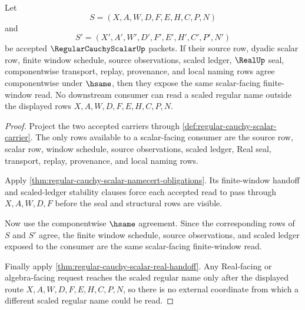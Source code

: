 \begin{theorem}
\label{thm:regular-cauchy-scalar-window-stability}
Let
$$
S=(X,A,W,D,F,E,H,C,P,N)
$$
and
$$
S'=(X',A',W',D',F',E',H',C',P',N')
$$
be accepted $\RegularCauchyScalarUp$ packets. If their source row, dyadic scalar row, finite window schedule, source observations, scaled ledger, $\RealUp$ seal, componentwise transport, replay, provenance, and local naming rows agree componentwise under $\hsame$, then they expose the same scalar-facing finite-window read. No downstream consumer can read a scaled regular name outside the displayed rows $X,A,W,D,F,E,H,C,P,N$.
\end{theorem}
\begin{proof}
Project the two accepted carriers through \autoref{def:regular-cauchy-scalar-carrier}. The only rows available to a scalar-facing consumer are the source row, scalar row, window schedule, source observations, scaled ledger, Real seal, transport, replay, provenance, and local naming rows.

Apply \autoref{thm:regular-cauchy-scalar-namecert-obligations}. Its finite-window handoff and scaled-ledger stability clauses force each accepted read to pass through $X,A,W,D,F$ before the seal and structural rows are visible.

Now use the componentwise $\hsame$ agreement. Since the corresponding rows of $S$ and $S'$ agree, the finite window schedule, source observations, and scaled ledger exposed to the consumer are the same scalar-facing finite-window read.

Finally apply \autoref{thm:regular-cauchy-scalar-real-handoff}. Any Real-facing or algebra-facing request reaches the scaled regular name only after the displayed route $X,A,W,D,F,E,H,C,P,N$, so there is no external coordinate from which a different scaled regular name could be read.
\end{proof}

